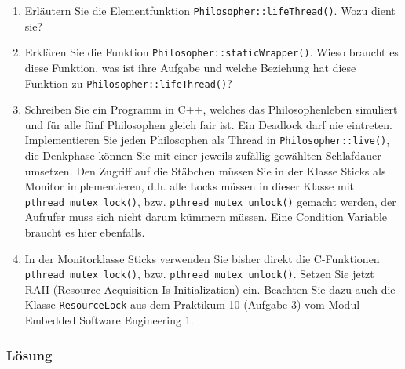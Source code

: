 \begin{enumerate}
  \item  Erläutern Sie die Elementfunktion \texttt{Philosopher::lifeThread()}. Wozu dient sie?
\item Erklären Sie die Funktion \texttt{Philosopher::staticWrapper()}. Wieso braucht es diese Funktion, was ist
ihre Aufgabe und welche Beziehung hat diese Funktion zu \texttt{Philosopher::lifeThread()}?
\item  Schreiben Sie ein Programm in C++, welches das Philosophenleben simuliert und für alle fünf Philosophen
gleich fair ist. Ein Deadlock darf nie eintreten. Implementieren Sie jeden Philosophen als Thread in
\texttt{Philosopher::live()}, die Denkphase können Sie mit einer jeweils zufällig gewählten Schlafdauer umsetzen.
Den Zugriff auf die Stäbchen müssen Sie in der Klasse Sticks als Monitor implementieren, d.h. alle
Locks müssen in dieser Klasse mit \texttt{pthread\_mutex\_lock()}, bzw. \texttt{pthread\_mutex\_unlock()} gemacht
werden, der Aufrufer muss sich nicht darum kümmern müssen. Eine Condition Variable braucht es hier
ebenfalls.
\item In der Monitorklasse Sticks verwenden Sie bisher direkt die C-Funktionen \texttt{pthread\_mutex\_lock()},
bzw. \texttt{pthread\_mutex\_unlock()}. Setzen Sie jetzt RAII (Resource Acquisition Is Initialization) ein. Beachten
Sie dazu auch die Klasse \texttt{ResourceLock} aus dem Praktikum 10 (Aufgabe 3) vom Modul Embedded
Software Engineering 1.
\end{enumerate}

\subsubsection{Lösung}

